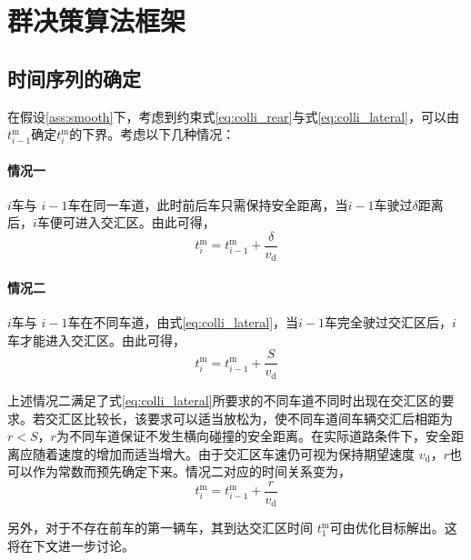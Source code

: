 \section{群决策算法框架}
\subsection{时间序列的确定}
在假设\ref{ass:smooth}下，考虑到约束式\ref{eq:colli_rear}与式\ref{eq:colli_lateral}，可以由$t_{i-1}^\mathrm{m}$确定$t_i^\mathrm{m}$的下界。考虑以下几种情况：
\paragraph{情况一} $i$车与 $i-1$车在同一车道，此时前后车只需保持安全距离，当$i-1$车驶过$\delta$距离后，$i$车便可进入交汇区。由此可得，
\begin{equation}
t_i^\mathrm{m}=t_{i-1}^\mathrm{m} + \frac{\delta}{v_\mathrm{d}}
\label{eq:t_case1}
\end{equation}
\paragraph{情况二}  $i$车与 $i-1$车在不同车道，由式\ref{eq:colli_lateral}，当$i-1$车完全驶过交汇区后，$i$车才能进入交汇区。由此可得，
\begin{equation}
t_i^\mathrm{m}=t_{i-1}^\mathrm{m} + \frac{S}{v_\mathrm{d}}
\label{eq:t_case2}
\end{equation}

上述情况二满足了式\ref{eq:colli_lateral}所要求的不同车道不同时出现在交汇区的要求。若交汇区比较长，该要求可以适当放松为，使不同车道间车辆交汇后相距为 $r < S$，$r$为不同车道保证不发生横向碰撞的安全距离。在实际道路条件下，安全距离应随着速度的增加而适当增大。由于交汇区车速仍可视为保持期望速度 $v_\mathrm{d}$，$r$也可以作为常数而预先确定下来。情况二对应的时间关系变为，
\begin{equation}
t_i^\mathrm{m}=t_{i-1}^\mathrm{m} + \frac{r}{v_\mathrm{d}}
\label{eq:t_case2r}
\end{equation}

另外，对于不存在前车的第一辆车，其到达交汇区时间 $t_1^\mathrm{m}$可由优化目标解出。这将在下文进一步讨论。

